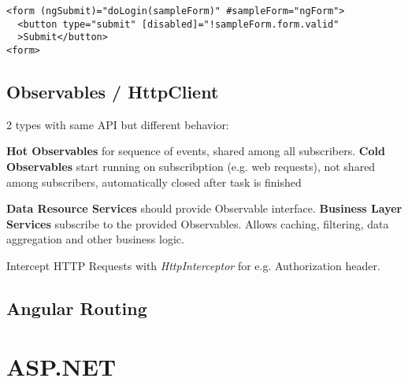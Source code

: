 \begin{multicols*}{4}
\begin{verbatim}
<form (ngSubmit)="doLogin(sampleForm)" #sampleForm="ngForm">
  <button type="submit" [disabled]="!sampleForm.form.valid"
  >Submit</button>
<form>
\end{verbatim}

\subsection{Observables / HttpClient}
2 types with same API but different behavior:

\textbf{Hot Observables} for sequence of events, shared among all subscribers.
\textbf{Cold Observables} start running on subscribption (e.g. web requests), not shared among subscribers, automatically closed after task is finished

\textbf{Data Resource Services} should provide Observable interface.
\textbf{Business Layer Services} subscribe to the provided Observables. Allows caching, filtering, data aggregation and other business logic.

Intercept HTTP Requests with \textit{HttpInterceptor} for e.g. Authorization header.

\subsection{Angular Routing}


\section{ASP.NET}

\end{multicols*}
